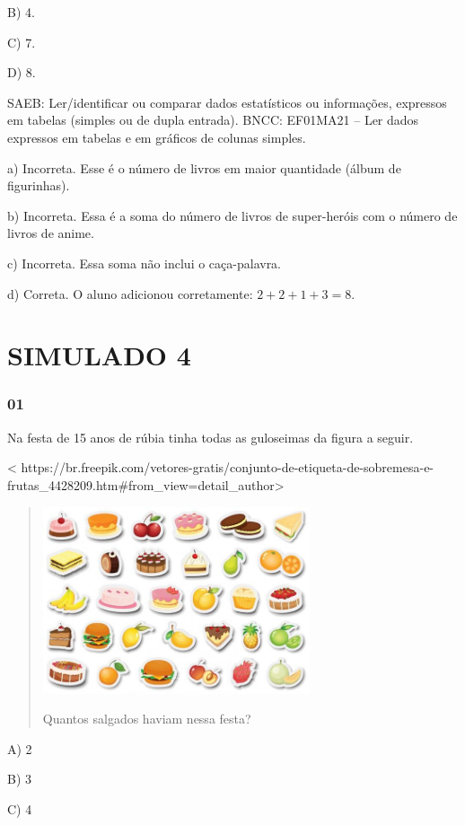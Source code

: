 \begin{itemize}
\begin{itemize}
B) 4.

C) 7.

D) 8.

SAEB: Ler/identificar ou comparar dados estatísticos ou
informações, expressos em tabelas (simples ou de dupla entrada).
BNCC: EF01MA21 -- Ler dados expressos em tabelas e em gráficos de colunas
simples.

a) Incorreta. Esse é o número de livros em maior quantidade (álbum de figurinhas).

b) Incorreta. Essa é a soma do número de livros de super-heróis com o número de livros de anime.

c) Incorreta. Essa soma não inclui o caça-palavra.

d) Correta. O aluno adicionou corretamente: \(2 + 2 + 1 + 3 = 8\).

\section{SIMULADO 4}\label{simulado-4}

\subsubsection{01}\label{section-132}

Na festa de 15 anos de rúbia tinha todas as guloseimas da figura a
seguir.

\textless{}
https://br.freepik.com/vetores-gratis/conjunto-de-etiqueta-de-sobremesa-e-frutas\_4428209.htm\#from\_view=detail\_author\textgreater{}

\begin{quote}
\includegraphics[width=3.09935in,height=2.16853in]{media/image151.jpg}

Quantos salgados haviam nessa festa?
\end{quote}

A) 2

B) 3

C) 4


\end{itemize}
\end{itemize}
